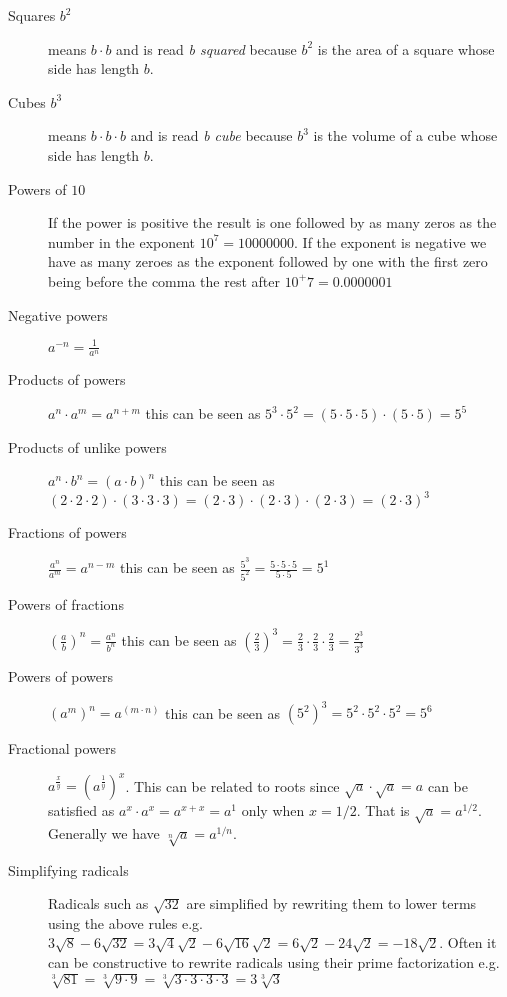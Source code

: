 \begin{description}
\item [Squares $b^2$] means $b \cdot b$ and is read \emph{b squared} because $b^2$ is the area of a square whose side has length $b$.
\item [Cubes $b^3$] means $b \cdot b \cdot b$ and is read \emph{b cube} because $b^3$ is the volume of a cube whose side has length $b$.
\item [Powers of $10$] If the power is positive the result is one followed by as many zeros as the number in the exponent $10^7 = 10000000$. If the exponent is negative we have as many zeroes as the exponent followed by one with the first zero being before the comma the rest after $10^+7 = 0.0000001$
\item [Negative powers] $a^{-n} = \frac{1}{a^n}$
\item [Products of powers] $a^n \cdot a^m = a^{n+m}$ this can be seen as $5^3 \cdot 5^2 = (5 \cdot 5 \cdot 5) \cdot (5 \cdot 5)= 5^5$
\item [Products of unlike powers] $a^n \cdot b^n = (a \cdot b)^n$ this can be seen as $(2 \cdot 2 \cdot 2) \cdot (3 \cdot 3 \cdot 3) = (2 \cdot 3) \cdot (2 \cdot 3) \cdot (2 \cdot 3) = (2 \cdot 3)^3$
\item [Fractions of powers] $\frac{a^n}{a^m} = a^{n-m}$ this can be seen as $\frac{5^3}{5^2} = \frac{5 \cdot 5 \cdot 5}{5 \cdot 5} = 5^1$
\item [Powers of fractions] $\left(\frac{a}{b}\right)^n = \frac{a^n}{b^n}$ this can be seen as $\left(\frac{2}{3}\right)^3 = \frac{2}{3} \cdot \frac{2}{3} \cdot \frac{2}{3} = \frac{2^3}{3^3}$
\item [Powers of powers] $(a^m)^n = a^{(m \cdot n)}$ this can be seen as $(5^2)^3 = 5^2 \cdot 5^2 \cdot 5^2 = 5^{6}$
\item [Fractional powers] $a^{\frac{x}{y}} = (a^{\frac{1}{y}})^x$. This can be related to roots since $\sqrt{a} \cdot \sqrt{a} = a$ can be satisfied as $a^{x} \cdot a^{x} = a^{x+x} = a^{1}$ only when $x = 1/2$. That is $\sqrt{a} = a^{1/2}$. Generally we have $\sqrt[n]{a} = a^{1/n}$.
\item [Simplifying radicals] Radicals such as $\sqrt{32}$ are simplified by rewriting them to lower terms using the above rules e.g. $3\sqrt{8} - 6\sqrt{32} = 3\sqrt{4}\sqrt{2} - 6\sqrt{16}\sqrt{2} = 6\sqrt{2} - 24\sqrt{2} = -18\sqrt{2}$. Often it can be constructive to rewrite radicals using their prime factorization e.g. $\sqrt[3]{81} = \sqrt[3]{9 \cdot 9} = \sqrt[3]{3 \cdot 3 \cdot 3 \cdot 3} = 3\sqrt[3]{3}$
\end{description}

